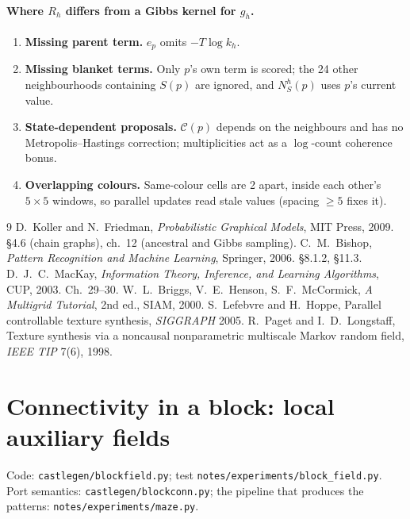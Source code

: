 \documentclass[11pt]{article}
\newcommand{\1}{\mathds{1}}
\begin{document}
\paragraph{Where $R_h$ differs from a Gibbs kernel for $g_h$.}
\begin{enumerate}
  \item \textbf{Missing parent term.} $e_p$ omits $-T\log k_h$.
  \item \textbf{Missing blanket terms.} Only $p$'s own term is scored; the 24 other
        neighbourhoods containing $S(p)$ are ignored, and $N_S^h(p)$ uses $p$'s current value.
  \item \textbf{State-dependent proposals.} $\mathcal{C}(p)$ depends on the neighbours and has
        no Metropolis--Hastings correction; multiplicities act as a $\log$-count coherence bonus.
  \item \textbf{Overlapping colours.} Same-colour cells are 2 apart, inside each other's
        $5\times5$ windows, so parallel updates read stale values (spacing $\ge 5$ fixes it).
\end{enumerate}

\begin{thebibliography}{9}
 D.~Koller and N.~Friedman, \emph{Probabilistic Graphical Models}, MIT Press,
  2009. \S4.6 (chain graphs), ch.~12 (ancestral and Gibbs sampling).
 C.~M.~Bishop, \emph{Pattern Recognition and Machine Learning}, Springer,
  2006. \S8.1.2, \S11.3.
 D.~J.~C.~MacKay, \emph{Information Theory, Inference, and Learning
  Algorithms}, CUP, 2003. Ch.~29--30.
 W.~L.~Briggs, V.~E.~Henson, S.~F.~McCormick, \emph{A Multigrid Tutorial},
  2nd ed., SIAM, 2000.
 S.~Lefebvre and H.~Hoppe, Parallel controllable texture synthesis,
  \emph{SIGGRAPH} 2005.
 R.~Paget and I.~D.~Longstaff, Texture synthesis via a noncausal nonparametric
  multiscale Markov random field, \emph{IEEE TIP} 7(6), 1998.
\end{thebibliography}

\section{Connectivity in a block: local auxiliary fields}

Code: \texttt{castlegen/blockfield.py}; test \texttt{notes/experiments/block\_field.py}.
Port semantics: \texttt{castlegen/blockconn.py}; the pipeline that produces the patterns:
\texttt{notes/experiments/maze.py}.
\end{document}
